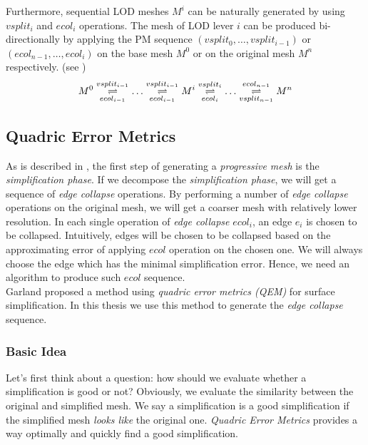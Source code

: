 Furthermore, sequential LOD meshes $M^i$ can be naturally generated by using $vsplit_i$ and $ecol_i$ operations. The mesh of LOD lever $i$ can be produced bi-directionally by applying the PM sequence $(vsplit_0,\ldots,vsplit_{i-1})$ or $(ecol_{n-1},\ldots,ecol_{i})$ on the base mesh $M^0$ or on the original mesh $M^n$ respectively. (see )
$$
	M^0\underset{ecol_{i-1}}{\overset{vsplit_{i-1}}\rightleftharpoons}\ldots\underset{ecol_{i-1}}{\overset{vsplit_{i-1}}\rightleftharpoons}M^i\underset{ecol_i}{\overset{vsplit_i}\rightleftharpoons}\ldots\underset{vsplit_{n-1}}{\overset{ecol_{n-1}}\rightleftharpoons}M^n
$$



\subsection{Quadric Error Metrics}
\label{subsection:theoreticalQEM}
As is described in , the first step of generating a \emph{progressive mesh} is the \emph{simplification phase}. If we decompose the \emph{simplification phase}, we will get a sequence of \emph{edge collapse} operations. By performing a number of \emph{edge collapse} operations on the original mesh, we will get a coarser mesh with relatively lower resolution. In each single operation of \emph{edge collapse} $ecol_i$, an edge $e_i$ is chosen to be collapsed. Intuitively, edges will be chosen to be collapsed based on the approximating error of applying $ecol$ operation on the chosen one. We will always choose the edge which has the minimal simplification error. Hence, we need an algorithm to produce such $ecol$ sequence. \\

Garland \etal\cite{Garland:1997:SSU} proposed a method using \emph{quadric error metrics (QEM)} for surface simplification. In this thesis we use this method to generate the \emph{edge collapse} sequence. 

\subsubsection{Basic Idea}
\label{QEM:BasicIdea}
Let's first think about a question: how should we evaluate whether a simplification is good or not? Obviously, we evaluate the similarity between the original and simplified mesh. We say a simplification is a good simplification if the simplified mesh \emph{looks like} the original one. \emph{Quadric Error Metrics}\cite{Garland:1997:SSU} provides a way optimally and quickly find a good simplification. \\

